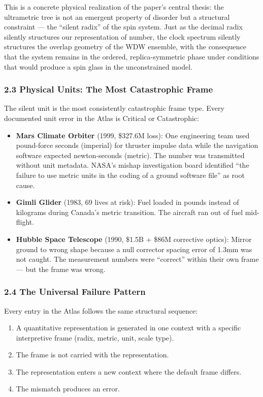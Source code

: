 \documentclass[
]{article}
\providecommand{\tightlist}{%
  \setlength{\itemsep}{0pt}\setlength{\parskip}{0pt}}
\begin{document}
This is a concrete physical realization of the paper's central thesis:
the ultrametric tree is not an emergent property of disorder but a
structural constraint --- the ``silent radix'' of the spin system. Just
as the decimal radix silently structures our representation of number,
the clock spectrum silently structures the overlap geometry of the WDW
ensemble, with the consequence that the system remains in the ordered,
replica-symmetric phase under conditions that would produce a spin glass
in the unconstrained model.

\subsubsection{2.3 Physical Units: The Most Catastrophic
Frame}\label{physical-units-the-most-catastrophic-frame}

The silent unit is the most consistently catastrophic frame type. Every
documented unit error in the Atlas is Critical or Catastrophic:

\begin{itemize}
\item
  \textbf{Mars Climate Orbiter} (1999, \$327.6M loss): One engineering
  team used pound-force seconds (imperial) for thruster impulse data
  while the navigation software expected newton-seconds (metric). The
  number was transmitted without unit metadata. NASA's mishap
  investigation board identified ``the failure to use metric units in
  the coding of a ground software file'' as root cause.
\item
  \textbf{Gimli Glider} (1983, 69 lives at risk): Fuel loaded in pounds
  instead of kilograms during Canada's metric transition. The aircraft
  ran out of fuel mid-flight.
\item
  \textbf{Hubble Space Telescope} (1990, \$1.5B + \$86M corrective
  optics): Mirror ground to wrong shape because a null corrector spacing
  error of 1.3mm was not caught. The measurement numbers were
  ``correct'' within their own frame --- but the frame was wrong.
\end{itemize}

\subsubsection{2.4 The Universal Failure
Pattern}\label{the-universal-failure-pattern}

Every entry in the Atlas follows the same structural sequence:

\begin{enumerate}
\def\labelenumi{\arabic{enumi}.}
\tightlist
\item
  A quantitative representation is generated in one context with a
  specific interpretive frame (radix, metric, unit, scale type).
\item
  The frame is not carried with the representation.
\item
  The representation enters a new context where the default frame
  differs.
\item
  The mismatch produces an error.
\end{enumerate}
\end{document}
